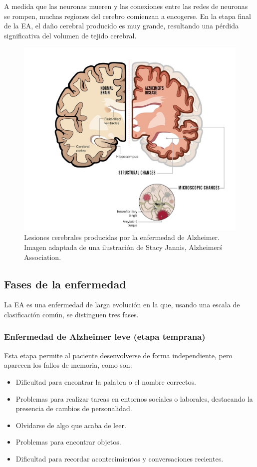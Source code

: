 A medida que las neuronas mueren y las conexiones entre las redes de neuronas se rompen, muchas regiones del cerebro
comienzan a encogerse.
En la etapa final de la EA, el daño cerebral producido es muy grande, resultando una pérdida significativa del volumen
de tejido cerebral.

\begin{figure}[H]
    \centering
    \includegraphics[width=\textwidth]{./imgs/lesiones-cerebrales}
    \caption{Lesiones cerebrales producidas por la enfermedad de Alzheimer.\\Imagen adaptada de una
    ilustración de Stacy Jannis, Alzheimer\'s Association.}
    \label{fig:lesiones-cerebrales}
\end{figure}

\subsection{Fases de la enfermedad}\label{subsec:fases-enfermedad}
La EA es una enfermedad de larga evolución en la que, usando una escala de clasificación común, se distinguen tres fases.

\subsubsection{Enfermedad de Alzheimer leve (etapa temprana)}\label{subsubsec:etapa-temprana-EA}
Esta etapa permite al paciente desenvolverse de forma independiente, pero aparecen los fallos de memoria, como son:
\begin{itemize}
    \item Dificultad para encontrar la palabra o el nombre correctos.
    \item Problemas para realizar tareas en entornos sociales o laborales, destacando la presencia de cambios de
    personalidad.
    \item Olvidarse de algo que acaba de leer.
    \item Problemas para encontrar objetos.
    \item Dificultad para recordar acontecimientos y conversaciones recientes.\\
\end{itemize}

